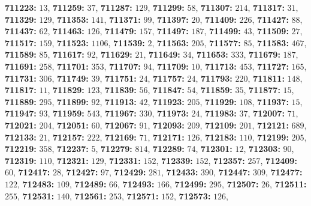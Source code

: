 \textsf{\bfseries 711223:} $13$, \textsf{\bfseries 711259:} $37$, \textsf{\bfseries 711287:} $129$, \textsf{\bfseries 711299:} $58$, \textsf{\bfseries 711307:} $214$, \textsf{\bfseries 711317:} $31$, \textsf{\bfseries 711329:} $129$, \textsf{\bfseries 711353:} $141$, \textsf{\bfseries 711371:} $99$, \textsf{\bfseries 711397:} $20$, \textsf{\bfseries 711409:} $226$, \textsf{\bfseries 711427:} $88$, \textsf{\bfseries 711437:} $62$, \textsf{\bfseries 711463:} $126$, \textsf{\bfseries 711479:} $157$, \textsf{\bfseries 711497:} $187$, \textsf{\bfseries 711499:} $43$, \textsf{\bfseries 711509:} $27$, \textsf{\bfseries 711517:} $159$, \textsf{\bfseries 711523:} $1106$, \textsf{\bfseries 711539:} $2$, \textsf{\bfseries 711563:} $205$, \textsf{\bfseries 711577:} $85$, \textsf{\bfseries 711583:} $467$, \textsf{\bfseries 711589:} $85$, \textsf{\bfseries 711617:} $92$, \textsf{\bfseries 711629:} $21$, \textsf{\bfseries 711649:} $34$, \textsf{\bfseries 711653:} $333$, \textsf{\bfseries 711679:} $187$, \textsf{\bfseries 711691:} $258$, \textsf{\bfseries 711701:} $353$, \textsf{\bfseries 711707:} $94$, \textsf{\bfseries 711709:} $10$, \textsf{\bfseries 711713:} $453$, \textsf{\bfseries 711727:} $165$, \textsf{\bfseries 711731:} $306$, \textsf{\bfseries 711749:} $39$, \textsf{\bfseries 711751:} $24$, \textsf{\bfseries 711757:} $24$, \textsf{\bfseries 711793:} $220$, \textsf{\bfseries 711811:} $148$, \textsf{\bfseries 711817:} $11$, \textsf{\bfseries 711829:} $123$, \textsf{\bfseries 711839:} $56$, \textsf{\bfseries 711847:} $54$, \textsf{\bfseries 711859:} $35$, \textsf{\bfseries 711877:} $15$, \textsf{\bfseries 711889:} $295$, \textsf{\bfseries 711899:} $92$, \textsf{\bfseries 711913:} $42$, \textsf{\bfseries 711923:} $205$, \textsf{\bfseries 711929:} $108$, \textsf{\bfseries 711937:} $15$, \textsf{\bfseries 711947:} $93$, \textsf{\bfseries 711959:} $543$, \textsf{\bfseries 711967:} $330$, \textsf{\bfseries 711973:} $24$, \textsf{\bfseries 711983:} $37$, \textsf{\bfseries 712007:} $71$, \textsf{\bfseries 712021:} $204$, \textsf{\bfseries 712051:} $60$, \textsf{\bfseries 712067:} $91$, \textsf{\bfseries 712093:} $209$, \textsf{\bfseries 712109:} $201$, \textsf{\bfseries 712121:} $689$, \textsf{\bfseries 712133:} $21$, \textsf{\bfseries 712157:} $222$, \textsf{\bfseries 712169:} $71$, \textsf{\bfseries 712171:} $126$, \textsf{\bfseries 712183:} $110$, \textsf{\bfseries 712199:} $205$, \textsf{\bfseries 712219:} $358$, \textsf{\bfseries 712237:} $5$, \textsf{\bfseries 712279:} $814$, \textsf{\bfseries 712289:} $74$, \textsf{\bfseries 712301:} $12$, \textsf{\bfseries 712303:} $90$, \textsf{\bfseries 712319:} $110$, \textsf{\bfseries 712321:} $129$, \textsf{\bfseries 712331:} $152$, \textsf{\bfseries 712339:} $152$, \textsf{\bfseries 712357:} $257$, \textsf{\bfseries 712409:} $60$, \textsf{\bfseries 712417:} $28$, \textsf{\bfseries 712427:} $97$, \textsf{\bfseries 712429:} $281$, \textsf{\bfseries 712433:} $390$, \textsf{\bfseries 712447:} $309$, \textsf{\bfseries 712477:} $122$, \textsf{\bfseries 712483:} $109$, \textsf{\bfseries 712489:} $66$, \textsf{\bfseries 712493:} $166$, \textsf{\bfseries 712499:} $295$, \textsf{\bfseries 712507:} $26$, \textsf{\bfseries 712511:} $255$, \textsf{\bfseries 712531:} $140$, \textsf{\bfseries 712561:} $253$, \textsf{\bfseries 712571:} $152$, \textsf{\bfseries 712573:} $126$, 
